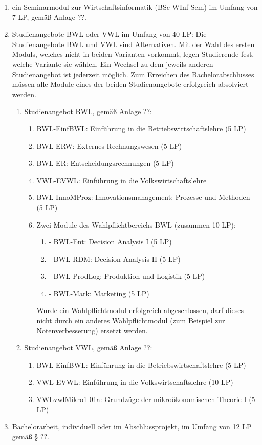 \documentclass{article}\usepackage{helvet}\renewcommand{\familydefault}{\sfdefault}\usepackage[letterpaper,top=2cm,bottom=2cm,left=3cm,right=3cm,marginparwidth=1.75cm]{geometry}\usepackage[colorlinks=true,allcolors=red]{hyperref}\usepackage{enumitem}\usepackage{tabularx}\usepackage[T1]{fontenc}\usepackage[utf8]{inputenc}\usepackage{fancyhdr}\usepackage{lastpage}\pagestyle{fancy}\fancyhf{}\setlistdepth{9}
\begin{document}
\begin{enumerate}[start=2,label=(\arabic*)]
{\begin{enumerate}[label=\arabic*.]
			\item{ein Seminarmodul zur Wirtschaftsinformatik (BSc-WInf-Sem) im Umfang von 7 LP, gemäß Anlage {\Large{??}}.}
			\item{Studienangebote BWL oder VWL im Umfang von 40 LP: Die Studienangebote BWL und VWL sind Alternativen. Mit der Wahl des ersten Moduls, welches nicht in beiden Varianten vorkommt, legen Studierende fest, welche Variante sie wählen. Ein Wechsel zu dem jeweils anderen Studienangebot ist jederzeit möglich. Zum Erreichen des Bachelorabschlusses müssen alle Module eines der beiden Studienangebote erfolgreich absolviert werden.
			\begin{enumerate}[label=\alph*)]
				\item{Studienangebot BWL, gemäß Anlage {\Large{??}}:
				\begin{enumerate}[label=\alph*\alph*)]
					\item{BWL-EinfBWL: Einführung in die Betriebswirtschaftslehre (5 LP)}
					\item{BWL-ERW: Externes Rechnungswesen (5 LP)}
					\item{BWL-ER: Entscheidungsrechnungen (5 LP)}
					\item{VWL-EVWL: Einführung in die Volkswirtschaftslehre}
					\item{BWL-InnoMProz: Innovationsmanagement: Prozesse und Methoden (5 LP)}
					\item{Zwei Module des Wahlpflichtbereichs BWL (zusammen 10 LP):
					\begin{enumerate}[label=\alph*\alph*\alph*)]
						\item{- BWL-Ent: Decision Analysis I (5 LP)}
						\item{- BWL-RDM: Decision Analysis II (5 LP)}
						\item{- BWL-ProdLog: Produktion und Logistik (5 LP)}
						\item{- BWL-Mark: Marketing (5 LP)}
					\end{enumerate}
Wurde ein Wahlpflichtmodul erfolgreich abgeschlossen, darf dieses nicht durch ein anderes Wahlpflichtmodul (zum Beispiel zur Notenverbesserung) ersetzt werden.}
				\end{enumerate}
}
				\item{Studienangebot VWL, gemäß Anlage {\Large{??}}:
				\begin{enumerate}[label=\alph*\alph*)]
					\item{BWL-EinfBWL: Einführung in die Betriebswirtschaftslehre (5 LP)}
					\item{VWL-EVWL: Einführung in die Volkswirtschaftslehre (10 LP)}
					\item{VWLvwlMikro1-01a: Grundzüge der mikroökonomischen Theorie I (5 LP)}
				\end{enumerate}
}
			\end{enumerate}
}
			\item{Bachelorarbeit, individuell oder im Abschlussprojekt, im Umfang von 12 LP gemäß § {\Large{??}}.}
		\end{enumerate}
}
	\end{enumerate}
\end{document}
